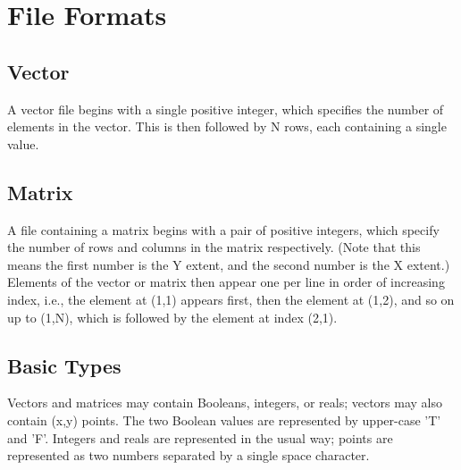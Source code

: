 \section{File Formats\label{s:formats}}

\subsection*{Vector}

A vector file begins with a single positive integer,
which specifies the number of elements in the vector.
This is then followed by N rows,
each containing a single value.

\subsection*{Matrix}

A file containing a matrix begins with a pair of positive integers,
which specify the number of rows and columns in the matrix respectively.
(Note that this means the first number is the Y extent, and the second number is the X extent.)
Elements of the vector or matrix then appear one per line in order of increasing index,
i.e.,
the element at (1,1) appears first,
then the element at (1,2),
and so on up to (1,N),
which is followed by the element at index (2,1).

\subsection*{Basic Types}

Vectors and matrices may contain Booleans, integers, or reals;
vectors may also contain (x,y) points.
The two Boolean values are represented by upper-case 'T' and 'F'.
Integers and reals are represented in the usual way;
points are represented as two numbers separated by a single space character.
